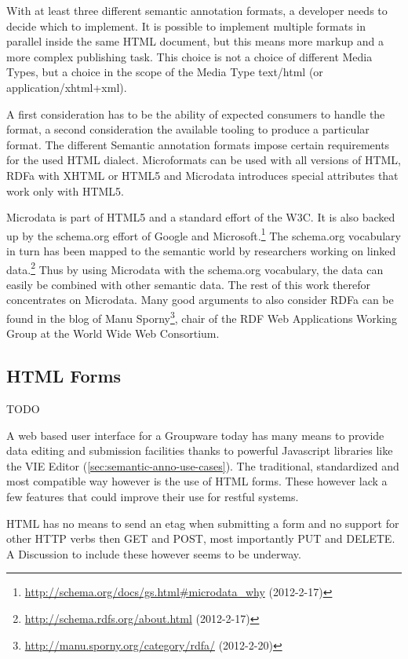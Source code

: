 \documentclass[12pt,a4paper,twoside]{scrartcl}		%
\newcommand{\citeurl}[2]{\url{#1} (#2)}
\begin{document}
With at least three different semantic annotation formats, a developer needs to
decide which to implement. It is possible to implement multiple formats in
parallel inside the same HTML document, but this means more markup and a more
complex publishing task\cite{Tennison2012}. This choice is not a choice of
different Media Types, but a choice in the scope of the Media Type text/html (or
application/xhtml+xml).

A first consideration has to be the ability of expected consumers to handle the
format, a second consideration the available tooling to produce a particular
format. The different Semantic annotation formats impose certain requirements
for the used HTML dialect. Microformats can be used with all versions of HTML,
RDFa with XHTML or HTML5 and Microdata introduces special attributes that work
only with HTML5\cite{Tennison2012}.

Microdata is part of HTML5 and a standard effort of the W3C\cite{Hickson2011}.
It is also backed up by the schema.org effort of Google and
Microsoft.\footnote{\citeurl{http://schema.org/docs/gs.html\#microdata_why}{2012-2-17}}
The schema.org vocabulary in turn has been mapped to the semantic world by
researchers working on linked
data.\footnote{\citeurl{http://schema.rdfs.org/about.html}{2012-2-17}} Thus by
using Microdata with the schema.org vocabulary, the data can easily be combined
with other semantic data. The rest of this work therefor concentrates on
Microdata. Many good arguments to also consider RDFa can be found in the blog of
Manu
Sporny\footnote{\citeurl{http://manu.sporny.org/category/rdfa/}{2012-2-20}},
chair of the RDF Web Applications Working Group at the World Wide Web
Consortium.


\subsection{HTML Forms}
\label{sec:html-forms}
TODO

A web based user interface for a Groupware today has many means to provide data
editing and submission facilities thanks to powerful Javascript libraries like
the VIE Editor (\autoref{sec:semantic-anno-use-cases}). The traditional,
standardized and most compatible way however is the use of HTML forms. These
however lack a few features that could improve their use for restful systems.

HTML has no means to send an etag when submitting a form and no support for
other HTTP verbs then GET and POST, most importantly PUT and DELETE. A
Discussion to include these however seems to be underway\cite{Amundsen2011}.
\end{document}
